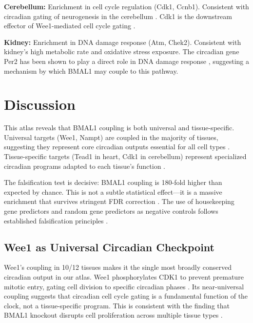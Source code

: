 \documentclass[11pt,letterpaper]{article}
\begin{document}
\textbf{Cerebellum:} Enrichment in cell cycle regulation (Cdk1, Ccnb1). Consistent with circadian gating of neurogenesis in the cerebellum \citep{geyfman2012brain}. Cdk1 is the downstream effector of Wee1-mediated cell cycle gating \citep{matsuo2003control}.

\textbf{Kidney:} Enrichment in DNA damage response (Atm, Chek2). Consistent with kidney's high metabolic rate and oxidative stress exposure. The circadian gene Per2 has been shown to play a direct role in DNA damage response \citep{fu2003circadian}, suggesting a mechanism by which BMAL1 may couple to this pathway.

\section{Discussion}

This atlas reveals that BMAL1 coupling is both universal and tissue-specific. Universal targets (Wee1, Nampt) are coupled in the majority of tissues, suggesting they represent core circadian outputs essential for all cell types \citep{takahashi2017transcriptional}. Tissue-specific targets (Tead1 in heart, Cdk1 in cerebellum) represent specialized circadian programs adapted to each tissue's function \citep{storch2002extensive, zhang2014circadian}.

The falsification test is decisive: BMAL1 coupling is 180-fold higher than expected by chance. This is not a subtle statistical effect---it is a massive enrichment that survives stringent FDR correction \citep{benjamini1995controlling}. The use of housekeeping gene predictors and random gene predictors as negative controls follows established falsification principles \citep{alon2006introduction}.

\subsection{Wee1 as Universal Circadian Checkpoint}

Wee1's coupling in 10/12 tissues makes it the single most broadly conserved circadian output in our atlas. Wee1 phosphorylates CDK1 to prevent premature mitotic entry, gating cell division to specific circadian phases \citep{matsuo2003control}. Its near-universal coupling suggests that circadian cell cycle gating is a fundamental function of the clock, not a tissue-specific program. This is consistent with the finding that BMAL1 knockout disrupts cell proliferation across multiple tissue types \citep{bunger2000mop3, geyfman2012brain}.
\end{document}
